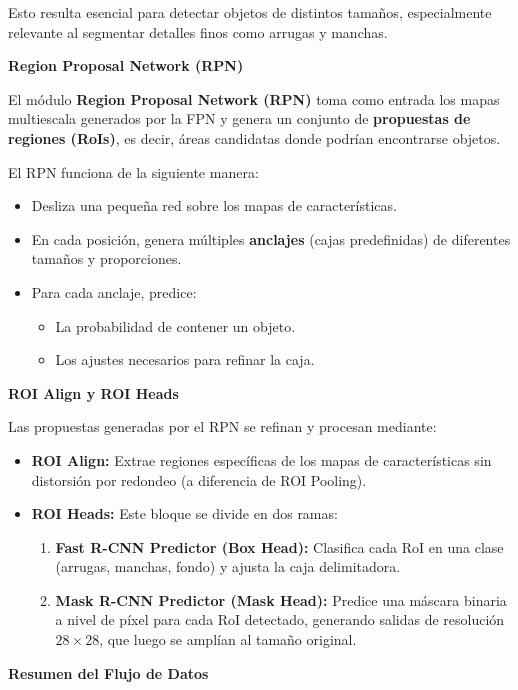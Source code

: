 \begin{enumerate}
\begin{itemize}
Esto resulta esencial para detectar objetos de distintos tamaños, especialmente relevante al segmentar detalles finos como arrugas y manchas.

\textbf{Region Proposal Network (RPN)}

El módulo \textbf{Region Proposal Network (RPN)} toma como entrada los mapas multiescala generados por la FPN y genera un conjunto de \textbf{propuestas de regiones (RoIs)}, es decir, áreas candidatas donde podrían encontrarse objetos.

El RPN funciona de la siguiente manera:
\begin{itemize}
    \item Desliza una pequeña red sobre los mapas de características.
    \item En cada posición, genera múltiples \textbf{anclajes} (cajas predefinidas) de diferentes tamaños y proporciones.
    \item Para cada anclaje, predice:
    \begin{itemize}
        \item La probabilidad de contener un objeto.
        \item Los ajustes necesarios para refinar la caja.
    \end{itemize}
\end{itemize}

\textbf{ROI Align y ROI Heads}

Las propuestas generadas por el RPN se refinan y procesan mediante:
\begin{itemize}
    \item \textbf{ROI Align:} Extrae regiones específicas de los mapas de características sin distorsión por redondeo (a diferencia de ROI Pooling).
    \item \textbf{ROI Heads:} Este bloque se divide en dos ramas:
    \begin{enumerate}
        \item \textbf{Fast R-CNN Predictor (Box Head):} 
        Clasifica cada RoI en una clase (arrugas, manchas, fondo) y ajusta la caja delimitadora.
        \item \textbf{Mask R-CNN Predictor (Mask Head):}
        Predice una máscara binaria a nivel de píxel para cada RoI detectado, generando salidas de resolución $28 \times 28$, que luego se amplían al tamaño original.
    \end{enumerate}
\end{itemize}

\textbf{Resumen del Flujo de Datos}


\end{itemize}
\end{enumerate}
